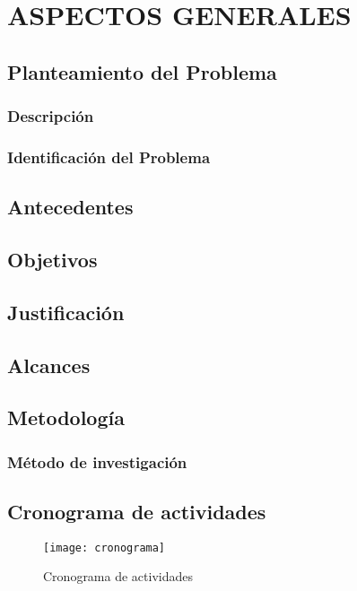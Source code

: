 \chapter{ASPECTOS GENERALES}
\label{cap:aspectosGenerales}
\setcounter{secnumdepth}{0}

\setcounter{secnumdepth}{3}
\section{Planteamiento del Problema}
\subsection{Descripción}

\blindtext

\subsection{Identificación del Problema}
\blindtext

\section{Antecedentes}
\blindtext
\blinditemize

\section{Objetivos}
\blindenumerate
  
\section{Justificación}
\blindtext

\section{Alcances}
\blindtext
  
\section{Metodología}
  \subsection{Método de investigación}
  \blindtext

\section{Cronograma de actividades}
  \begin{figure}[h!]
    \centering
	  \texttt{[image: cronograma]}
	  \caption{Cronograma de actividades}
	  \label{Fig:Cap:AspectosGenerales:Cronograma}
	\end{figure}
